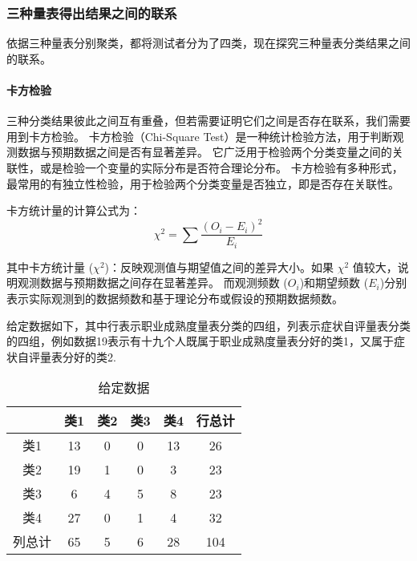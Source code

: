 \documentclass[withoutpreface,bwprint]{cumcmthesis} %
\begin{document}
\subsubsection{三种量表得出结果之间的联系}

依据三种量表分别聚类，都将测试者分为了四类，现在探究三种量表分类结果之间的联系。

\paragraph*{卡方检验}三种分类结果彼此之间互有重叠，但若需要证明它们之间是否存在联系，我们需要用到卡方检验。
卡方检验（Chi-Square Test）是一种统计检验方法，用于判断观测数据与预期数据之间是否有显著差异。
它广泛用于检验两个分类变量之间的关联性，或是检验一个变量的实际分布是否符合理论分布。
卡方检验有多种形式，最常用的有独立性检验，用于检验两个分类变量是否独立，即是否存在关联性。


卡方统计量的计算公式为：
\begin{equation}
    \chi^2 = \sum \frac{(O_i - E_i)^2}{E_i}
    \label{eq:Chi-Square}
\end{equation}

其中卡方统计量 (\(\chi^2\))：反映观测值与期望值之间的差异大小。如果 \(\chi^2\) 值较大，说明观测数据与预期数据之间存在显著差异。
而观测频数 (\(O_i\))和期望频数 (\(E_i\))分别表示实际观测到的数据频数和基于理论分布或假设的预期数据频数。

给定数据如下，其中行表示职业成熟度量表分类的四组，列表示症状自评量表分类的四组，例如数据19表示有十九个人既属于职业成熟度量表分好的类1，又属于症状自评量表分好的类2.

\begin{table}[htbp]
    \centering
    \begin{tabular}{|c|c|c|c|c|c|}
        \hline
        & 类1 & 类2 & 类3 & 类4 & 行总计 \\
        \hline
        类1 & 13 & 0 & 0 & 13 & 26 \\
        \hline
        类2 & 19 & 1 & 0 & 3 & 23 \\
        \hline
        类3 & 6 & 4 & 5 & 8 & 23 \\
        \hline
        类4 & 27 & 0 & 1 & 4 & 32 \\
        \hline
        列总计 & 65 & 5 & 6 & 28 & 104 \\
        \hline
    \end{tabular}
    \caption{给定数据}
    \label{tab:data}
\end{table}
\end{document}
